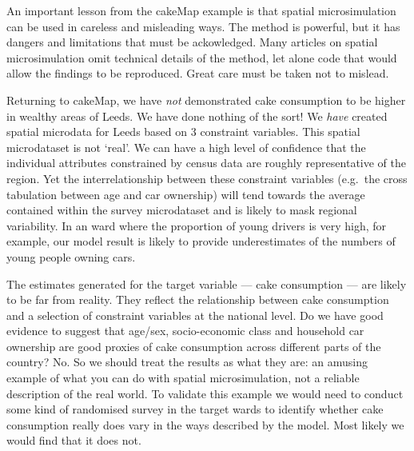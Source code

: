 \documentclass[a4paper, 11pt, twoside]{article}
\begin{document}
An important lesson from the cakeMap example is
that spatial microsimulation can be used in careless and misleading ways.
The method is powerful, but it has dangers and limitations that must be ackowledged.
Many articles on spatial microsimulation omit technical details of the method,
let alone code that would allow the findings to be reproduced. Great
care must be taken not to mislead.

Returning to cakeMap, we have \emph{not}
demonstrated cake consumption to be higher in wealthy areas of Leeds.
We have done nothing of the sort! We \emph{have} created spatial microdata
for Leeds based on 3 constraint variables.
This spatial microdataset is not `real'. We can have a high level of confidence that the
individual attributes constrained by census data are roughly representative of the region.
Yet the interrelationship between these constraint variables
(e.g.~the cross tabulation between age and car ownership) will tend towards the average
contained within the survey microdataset and is likely to mask regional variability. In an ward
where the proportion of young drivers is very high, for example, our model result is likely
to provide underestimates of the numbers of young people owning cars.

The estimates generated for the target variable --- cake consumption --- are likely to be
far from reality. They reflect the relationship between cake consumption and
a selection of constraint variables at the national level. Do we have good evidence to suggest
that age/sex, socio-economic class and household car ownership are good proxies of cake consumption
across different parts of the country? No. So we should treat the results as what they are:
an amusing example of what you can do with spatial microsimulation, not a reliable description
of the real world. To validate this example we would need to conduct some kind of randomised
survey in the target wards to identify whether cake consumption really does vary in the ways
described by the model. Most likely we would find that it does not.
\end{document}
